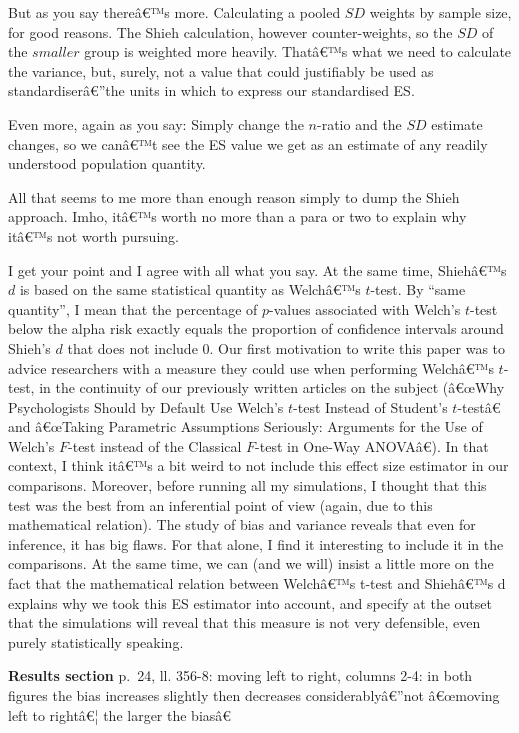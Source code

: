 \begin{appendix}
But as you say thereâ€™s more. Calculating a pooled \(SD\) weights by
sample size, for good reasons. The Shieh calculation, however
counter-weights, so the \(SD\) of the \(smaller\) group is weighted more
heavily. Thatâ€™s what we need to calculate the variance, but, surely,
not a value that could justifiably be used as standardiserâ€''the units
in which to express our standardised ES.

Even more, again as you say: Simply change the \(n\)-ratio and the
\(SD\) estimate changes, so we canâ€™t see the ES value we get as an
estimate of any readily understood population quantity.

All that seems to me more than enough reason simply to dump the Shieh
approach. Imho, itâ€™s worth no more than a para or two to explain why
itâ€™s not worth pursuing.

\color{blue} I get your point and I agree with all what you say. At the
same time, Shiehâ€™s \(d\) is based on the same statistical quantity as
Welchâ€™s \(t\)-test. By ``same quantity'', I mean that the percentage
of \(p\)-values associated with Welch's \(t\)-test below the alpha risk
exactly equals the proportion of confidence intervals around Shieh's
\(d\) that does not include 0. Our first motivation to write this paper
was to advice researchers with a measure they could use when performing
Welchâ€™s \(t\)-test, in the continuity of our previously written
articles on the subject (â€œWhy Psychologists Should by Default Use
Welch's \(t\)-test Instead of Student's \(t\)-testâ€ and â€œTaking
Parametric Assumptions Seriously: Arguments for the Use of Welch's
\(F\)-test instead of the Classical \(F\)-test in One-Way ANOVAâ€). In
that context, I think itâ€™s a bit weird to not include this effect size
estimator in our comparisons. Moreover, before running all my
simulations, I thought that this test was the best from an inferential
point of view (again, due to this mathematical relation). The study of
bias and variance reveals that even for inference, it has big flaws. For
that alone, I find it interesting to include it in the comparisons. At
the same time, we can (and we will) insist a little more on the fact
that the mathematical relation between Welchâ€™s t-test and Shiehâ€™s d
explains why we took this ES estimator into account, and specify at the
outset that the simulations will reveal that this measure is not very
defensible, even purely statistically speaking.

\color{black} \textbf{Results section} p.~24, ll. 356-8: moving left to
right, columns 2-4: in both figures the bias increases slightly then
decreases considerablyâ€''not â€œmoving left to rightâ€¦ the larger the
biasâ€


\end{appendix}
